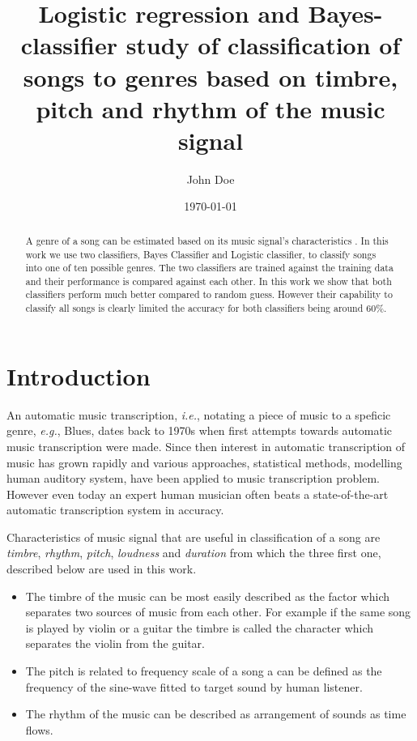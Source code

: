 \documentclass[aps,prb,10pt,twocolumn,groupedaddress]{revtex4-1}
\begin{document}
\title{Logistic regression and Bayes-classifier study of classification of
  songs to genres based on timbre, pitch and rhythm of the music signal }
\date{\today}
\author{John Doe}

\begin{abstract}
  A genre of a song can be estimated based on its music signal's
  characteristics . In this work we use two classifiers, Bayes Classifier
  and Logistic classifier, to classify songs into one of ten possible genres. The
  two classifiers are trained against the training data and their performance is
  compared against each other. In this work we show that both classifiers
  perform much better compared to random guess. However their capability to
  classify all songs is clearly limited the accuracy for both classifiers being
  around 60\%.
\end{abstract}

\maketitle

\section{Introduction}
An automatic music transcription, \textit{i.e.}, notating a piece of music to
a speficic genre, \textit{e.g.}, Blues, dates back to 1970s when first attempts
towards automatic music transcription were made\cite{musictranscription}. Since
then interest in
automatic transcription of music has grown rapidly and various approaches,
statistical methods, modelling human auditory system, have been applied to
music transcription problem. However even today an expert human musician often
beats a state-of-the-art automatic transcription system in accuracy.

Characteristics of music signal that are useful in classification of a song
are \textit{timbre}, \textit{rhythm}, \textit{pitch}, \textit{loudness} and
\textit{duration}\cite{musictranscription} from which the three first one,
described below are used in this work.
\begin{itemize}  
\item The timbre of the music can be most easily described as the factor
  which separates two sources of music from each other. For example if the same
  song is played by violin or a guitar the timbre is called the character which
  separates the violin from the guitar.
\item The pitch is related to frequency scale of a song a can be defined as the
  frequency of the sine-wave fitted to target sound by human listener.
\item The rhythm of the music can be described as arrangement of sounds as time
  flows.
\end{itemize}
\end{document}

